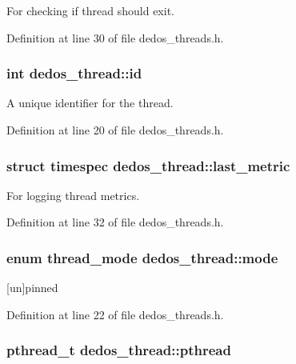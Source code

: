 For checking if thread should exit. 



Definition at line 30 of file dedos\-\_\-threads.\-h.

\hypertarget{structdedos__thread_a9ec2f386c1e31415ee26e54c39f0f02a}{
\subsubsection[{id}]{\setlength{\rightskip}{0pt plus 5cm}int dedos\-\_\-thread\-::id}}\label{structdedos__thread_a9ec2f386c1e31415ee26e54c39f0f02a}


A unique identifier for the thread. 



Definition at line 20 of file dedos\-\_\-threads.\-h.

\hypertarget{structdedos__thread_aa45d04173d89640ec2ddeb95c66db84e}{
\subsubsection[{last\-\_\-metric}]{\setlength{\rightskip}{0pt plus 5cm}struct timespec dedos\-\_\-thread\-::last\-\_\-metric}}\label{structdedos__thread_aa45d04173d89640ec2ddeb95c66db84e}


For logging thread metrics. 



Definition at line 32 of file dedos\-\_\-threads.\-h.

\hypertarget{structdedos__thread_a70d31c1db4f14b59fd88148f5a4d8cbb}{
\subsubsection[{mode}]{\setlength{\rightskip}{0pt plus 5cm}enum {\bf thread\-\_\-mode} dedos\-\_\-thread\-::mode}}\label{structdedos__thread_a70d31c1db4f14b59fd88148f5a4d8cbb}


\mbox{[}un\mbox{]}pinned 



Definition at line 22 of file dedos\-\_\-threads.\-h.

\hypertarget{structdedos__thread_a7a40b7dea35c3ebfb87974126bdd52f8}{
\subsubsection[{pthread}]{\setlength{\rightskip}{0pt plus 5cm}pthread\-\_\-t dedos\-\_\-thread\-::pthread}}\label{structdedos__thread_a7a40b7dea35c3ebfb87974126bdd52f8}


